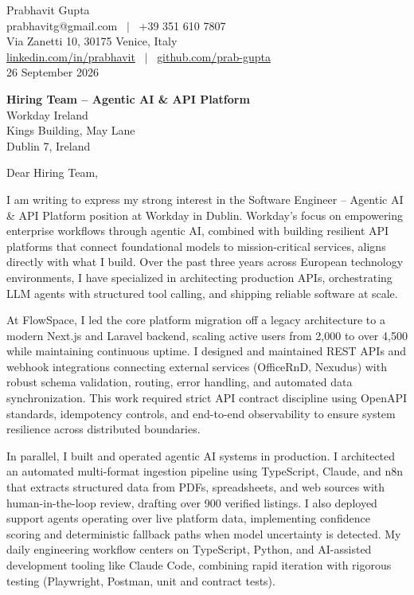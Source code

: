 \documentclass[10.5pt,a4paper]{article}
\begin{document}
Prabhavit Gupta\\
prabhavitg@gmail.com ~$\vert$~ +39 351 610 7807\\
Via Zanetti 10, 30175 Venice, Italy\\
\href{https://www.linkedin.com/in/prabhavit/}{linkedin.com/in/prabhavit} ~$\vert$~ \href{https://github.com/prab-gupta}{github.com/prab-gupta}\\
26 September 2026

\textbf{Hiring Team -- Agentic AI \& API Platform}\\
Workday Ireland\\
Kings Building, May Lane\\
Dublin 7, Ireland

Dear Hiring Team,

I am writing to express my strong interest in the Software Engineer -- Agentic AI \& API Platform position at Workday in Dublin. Workday's focus on empowering enterprise workflows through agentic AI, combined with building resilient API platforms that connect foundational models to mission-critical services, aligns directly with what I build. Over the past three years across European technology environments, I have specialized in architecting production APIs, orchestrating LLM agents with structured tool calling, and shipping reliable software at scale.

At FlowSpace, I led the core platform migration off a legacy architecture to a modern Next.js and Laravel backend, scaling active users from 2,000 to over 4,500 while maintaining continuous uptime. I designed and maintained REST APIs and webhook integrations connecting external services (OfficeRnD, Nexudus) with robust schema validation, routing, error handling, and automated data synchronization. This work required strict API contract discipline using OpenAPI standards, idempotency controls, and end-to-end observability to ensure system resilience across distributed boundaries.

In parallel, I built and operated agentic AI systems in production. I architected an automated multi-format ingestion pipeline using TypeScript, Claude, and n8n that extracts structured data from PDFs, spreadsheets, and web sources with human-in-the-loop review, drafting over 900 verified listings. I also deployed support agents operating over live platform data, implementing confidence scoring and deterministic fallback paths when model uncertainty is detected. My daily engineering workflow centers on TypeScript, Python, and AI-assisted development tooling like Claude Code, combining rapid iteration with rigorous testing (Playwright, Postman, unit and contract tests).
\end{document}

